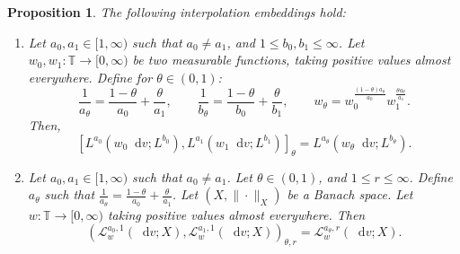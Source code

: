 \documentclass[11pt,a4paper,reqno]{amsart}
\theoremstyle{plain}
\newtheorem{proposition}[theorem]{Proposition}
\theoremstyle{remark}
\newcommand{\dd}{\mathop{}\!\mathrm{d}}
\begin{document}
\begin{proposition}\label{prop.interpolation}
The following interpolation embeddings hold: 
\begin{enumerate}[label=(\roman*)]
    \item Let $a_0, a_1 \in [1,\infty)$ such that $a_0\neq a_1$, and $1 \leq b_0, b_1\leq \infty$. Let $w_0, w_1 : \mathbb{T} \to [0,\infty)$ be two measurable functions, taking positive values almost everywhere. Define for $\theta \in (0,1)$: 
    \[
        \frac{1}{a_{\theta}} = \frac{1-\theta}{a_0} + \frac{\theta}{a_1}, \qquad \frac{1}{b_{\theta}} = \frac{1-\theta}{b_0} + \frac{\theta}{b_1}, \qquad w_{\theta}=w_0^{\frac{(1-\theta)a_\theta}{a_0}}w_1^{\frac{\theta a_\theta}{a_1}}. 
    \]
    Then, 
    \[
        [L^{a_0}(w_0\dd v  ;L^{b_0}),L^{a_1}(w_1\dd v;L^{b_1})]_{\theta} = L^{a_{\theta}}(w_{\theta}\dd v;L^{b_{\theta}}).
    \]    
    \item Let $a_0, a_1 \in [1,\infty)$ such that $a_0 \neq a_1$. Let $\theta \in (0,1)$, and $1\leq r \leq \infty$. Define $a_{\theta}$ such that $\frac{1}{a_{\theta}} = \frac{1-\theta}{a_0} + \frac{\theta}{a_1}$. Let $(X,\|\cdot\|_X)$ be a Banach space. Let $w : \mathbb{T} \to [0,\infty)$ taking positive values almost everywhere. Then 
    \[
        \left(\mathcal{L}_w^{a_0,1}(\dd v;X),\mathcal{L}_w^{a_1,1}(\dd v;X)\right)_{\theta,r} = \mathcal{L}_w^{a_{\theta},r}(\dd v;X).
    \]
\end{enumerate}
\end{proposition}
\end{document}
